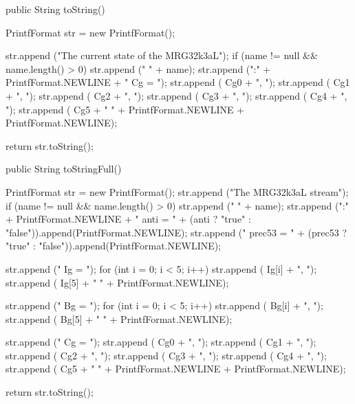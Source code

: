 \iffalse
 \begin{tabb} Returns the current state $C_g$ of this stream.
  This is a vector of 6 integers represented in floating-point format.
  This method is convenient if we want to save the state for
  subsequent use.
 \end{tabb}
\fi
\begin{htmlonly}
\end{htmlonly}
\begin{code}

   public String toString() \begin{hide} {
      PrintfFormat str = new PrintfFormat();

      str.append ("The current state of the MRG32k3aL");
      if (name != null && name.length() > 0)
         str.append (" " + name);
      str.append (":" + PrintfFormat.NEWLINE + "   Cg = { ");
      str.append ( Cg0 + ", ");
      str.append ( Cg1 + ", ");
      str.append ( Cg2 + ", ");
      str.append ( Cg3 + ", ");
      str.append ( Cg4 + ", ");
      str.append ( Cg5 + " }" + PrintfFormat.NEWLINE +
           PrintfFormat.NEWLINE);

      return str.toString();
   }\end{hide}
\end{code}
\iffalse
 \begin{tabb} Returns a string containing the name and the current state $C_g$
   of this stream.
 \end{tabb}
\fi
\begin{htmlonly}
\end{htmlonly}
\begin{code}

   public String toStringFull() \begin{hide} {
      PrintfFormat str = new PrintfFormat();
      str.append ("The MRG32k3aL stream");
      if (name != null && name.length() > 0)
         str.append (" " + name);
      str.append (":" + PrintfFormat.NEWLINE + "   anti = " +
         (anti ? "true" : "false")).append(PrintfFormat.NEWLINE);
      str.append ("   prec53 = " + (prec53 ? "true" : "false")).append(PrintfFormat.NEWLINE);

      str.append ("   Ig = { ");
      for (int i = 0; i < 5; i++)
         str.append ( Ig[i] + ", ");
      str.append ( Ig[5] + " }" + PrintfFormat.NEWLINE);

      str.append ("   Bg = { ");
      for (int i = 0; i < 5; i++)
         str.append ( Bg[i] + ", ");
      str.append ( Bg[5] + " }" + PrintfFormat.NEWLINE);

      str.append ("   Cg = { ");
      str.append ( Cg0 + ", ");
      str.append ( Cg1 + ", ");
      str.append ( Cg2 + ", ");
      str.append ( Cg3 + ", ");
      str.append ( Cg4 + ", ");
      str.append ( Cg5 + " }" + PrintfFormat.NEWLINE +
          PrintfFormat.NEWLINE);

      return str.toString();
   }\end{hide}
\end{code}
